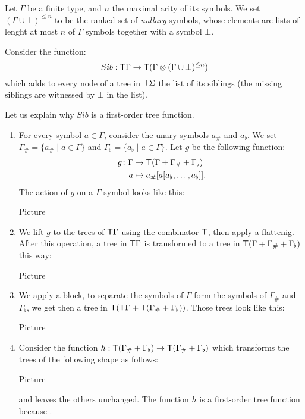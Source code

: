 \bigskip
\noindent \begin{example}
Let $\Gamma$ be a finite type, and $n$ the maximal arity of its symbols. We set $(\Gamma\cup\bot)^{\leq n}$ to be the ranked set of \emph{nullary} symbols, whose elements are lists of lenght at most $n$ of $\Gamma$ symbols together with a symbol $\bot$.

\medskip
Consider the function:
$$ Sib: \mathsf T \Gamma \to \mathsf T (\Gamma\otimes (\Gamma\cup\bot)^{\leq n})$$
which adds to every node of a tree in $\mathsf T \Sigma$ the list of its siblings (the missing siblings are witnessed by $\bot$ in the list).

Let us explain why $Sib$ is a first-order tree function. 
\begin{enumerate}
\item For every symbol $a\in \Gamma$, consider the unary symbols $a_\#$ and $a_\flat$.
We set $\Gamma_\#=\{a_\#\mid a\in\Gamma\}$ and $\Gamma_\flat=\{a_\flat\mid a\in\Gamma\}$.
Let $g$ be the following function:
 \begin{align*}
  g\colon \Gamma &\to \mathsf T(\Gamma+\Gamma_\#+\Gamma_\flat)\\
  a &\mapsto a_\#[a[a_\flat,\dots,a_\flat]].
\end{align*}
The action of $g$ on a $\Gamma$ symbol looks like this:
\begin{center}
Picture
\end{center}
\item We lift $g$ to the trees of $\mathsf T \Gamma$ using the combinator $\mathsf T$, then apply a flattenig. After this operation, a tree in $\mathsf T\Gamma$ is transformed to a tree in $\mathsf T(\Gamma+\Gamma_\#+\Gamma_\flat)$ this way:
\begin{center}
Picture
\end{center}
\item We apply a block, to separate the symbols of $\Gamma$ form the symbols of $\Gamma_\#$ and $\Gamma_\flat$, we get then a tree in $\mathsf T(\mathsf T\Gamma+\mathsf T(\Gamma_\#+\Gamma_\flat))$. Those trees look like this:
\begin{center}
Picture
\end{center}
\item Consider the function $h:\mathsf T(\Gamma_\#+\Gamma_\flat)\to \mathsf T(\Gamma_\#+\Gamma_\flat)$ which transforms the trees of the following shape as follows:
\begin{center}
Picture
\end{center}
and leaves the others unchanged. 
The function $h$ is a first-order tree function because .


\end{enumerate}
\end{example}
